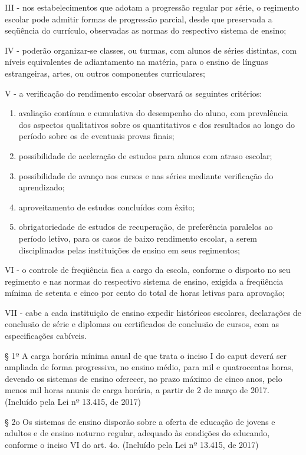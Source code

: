 \documentclass[
]{book}
\begin{document}
III - nos estabelecimentos que adotam a progressão regular por série, o regimento escolar pode admitir formas de progressão parcial, desde que preservada a seqüência do currículo, observadas as normas do respectivo sistema de ensino;

IV - poderão organizar-se classes, ou turmas, com alunos de séries distintas, com níveis equivalentes de adiantamento na matéria, para o ensino de línguas estrangeiras, artes, ou outros componentes curriculares;

V - a verificação do rendimento escolar observará os seguintes critérios:

\begin{enumerate}
\def\labelenumi{\alph{enumi})}
\item
  avaliação contínua e cumulativa do desempenho do aluno, com prevalência dos aspectos qualitativos sobre os quantitativos e dos resultados ao longo do período sobre os de eventuais provas finais;
\item
  possibilidade de aceleração de estudos para alunos com atraso escolar;
\item
  possibilidade de avanço nos cursos e nas séries mediante verificação do aprendizado;
\item
  aproveitamento de estudos concluídos com êxito;
\item
  obrigatoriedade de estudos de recuperação, de preferência paralelos ao período letivo, para os casos de baixo rendimento escolar, a serem disciplinados pelas instituições de ensino em seus regimentos;
\end{enumerate}

VI - o controle de freqüência fica a cargo da escola, conforme o disposto no seu regimento e nas normas do respectivo sistema de ensino, exigida a freqüência mínima de setenta e cinco por cento do total de horas letivas para aprovação;

VII - cabe a cada instituição de ensino expedir históricos escolares, declarações de conclusão de série e diplomas ou certificados de conclusão de cursos, com as especificações cabíveis.

§ 1º A carga horária mínima anual de que trata o inciso I do caput deverá ser ampliada de forma progressiva, no ensino médio, para mil e quatrocentas horas, devendo os sistemas de ensino oferecer, no prazo máximo de cinco anos, pelo menos mil horas anuais de carga horária, a partir de 2 de março de 2017. (Incluído pela Lei nº 13.415, de 2017)

§ 2o Os sistemas de ensino disporão sobre a oferta de educação de jovens e adultos e de ensino noturno regular, adequado às condições do educando, conforme o inciso VI do art. 4o. (Incluído pela Lei nº 13.415, de 2017)
\end{document}
